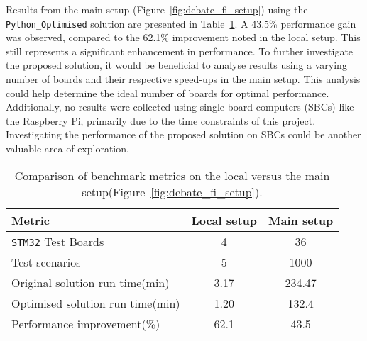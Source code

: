 Results from the main setup (Figure~\ref{fig:debate_fi_setup}) using the \texttt{Python\_Optimised} solution are presented in Table~\ref{tab:debate_metrics}. A 43.5\% performance gain was observed, compared to the 62.1\% improvement noted in the local setup. This still represents a significant enhancement in performance. To further investigate the proposed solution, it would be beneficial to analyse results using a varying number of boards and their respective speed-ups in the main setup. This analysis could help determine the ideal number of boards for optimal performance. Additionally, no results were collected using single-board computers (SBCs) like the Raspberry Pi, primarily due to the time constraints of this project. Investigating the performance of the proposed solution on SBCs could be another valuable area of exploration.

\begin{table}[H]
	\centering
	\begin{tabular}{@{}lcc@{}} %
		\toprule
		\textbf{Metric} & \textbf{Local setup} & \textbf{Main setup} \\
		\midrule
		\texttt{STM32} Test Boards & 4 & 36 \\ \hline
		Test scenarios & 5 & 1000 \\ \hline
		Original solution run time(min) & 3.17 & 234.47 \\ \hline
		Optimised solution run time(min) & 1.20 & 132.4 \\ \hline
		Performance improvement(\%) & 62.1 & 43.5 \\ 
		\bottomrule
	\end{tabular}
	\caption{Comparison of benchmark metrics on the local versus the main setup(Figure~\ref{fig:debate_fi_setup}).}
	\label{tab:debate_metrics}
\end{table}